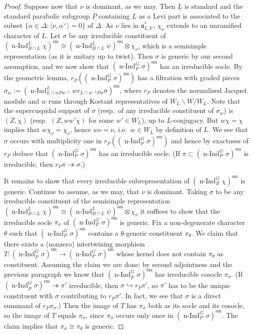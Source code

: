 \documentclass[a4paper]{amsart}
\numberwithin{equation}{section}
\theoremstyle{remark}
\theoremstyle{definition}
\DeclareMathOperator{\nInd}{n-Ind}
\newcommand{\R}{\mathbb{R}}
\newcommand{\sm}{\mathrm{sm}}
\newcommand{\alggrp}[1]{\underline{#1}}
\newcommand{\ang}[1]{\langle #1\rangle}
\newcommand{\into}{\hookrightarrow}
\newcommand{\onto}{\twoheadrightarrow}
\renewcommand{\o}[1]{\overline{#1}}
\begin{document}
\begin{proof}
  Suppose now that $\nu$ is dominant, as we may.
  Then $\alggrp{L}$ is standard and the standard parabolic subgroup $\alggrp{P}$ containing $\alggrp{L}$ as a Levi part is associated to the subset $\{\alpha \in \Delta : \ang{\nu,\alpha^\vee} = 0\}$ of $\Delta$.
  As $\nu$ lies in $\mathfrak a^*_{L,\R}$, $\chi_{\nu}$ extends to an unramified character of $L$.
  Let $\sigma$ be any irreducible constituent of $(\nInd_{B \cap L}^{L} \chi)^{\sm} \cong (\nInd_{B \cap L}^{L} \psi)^{\sm} \otimes \chi_\nu$, which is a semisimple representation (as it is unitary up to twist).
  Then $\sigma$ is generic by our second assumption, and we now show that $(\nInd_{P}^{G} \sigma)^{\sm}$ has an irreducible socle.
  By the geometric lemma, $r_P((\nInd_{P}^{G} \sigma)^{\sm})$ has a filtration with graded pieces $\sigma_w := (\nInd_{L \cap w P w^{-1}}^{L} w r_{L \cap w^{-1} P w}\sigma)^{\sm}$, where $r_P$ denotes the normalized Jacquet module and $w$ runs through Kostant representatives of $W_L\backslash W/W_L$.
  Note that the supercuspidal support of $\sigma$ (resp.\ of any irreducible constituent of $\sigma_w$) is $(Z,\chi)$ (resp.\ $(Z,ww'\chi)$ for some $w' \in W_L$), up to $L$-conjugacy.
  But $w\chi = \chi$ implies that $w\chi_\nu = \chi_\nu$, hence $w\nu = \nu$, i.e.\ $w \in W_L$ by definition of $L$.
  We see that $\sigma$ occurs with multiplicity one in $r_P((\nInd_{P}^{G} \sigma)^{\sm})$ and hence by exactness of $r_P$ deduce that $(\nInd_{P}^{G} \sigma)^{\sm}$ has an irreducible socle.
  (If $\pi \subset (\nInd_{P}^{G} \sigma)^{\sm}$ is irreducible, then $r_P \pi \onto \sigma$.)

  It remains to show that every irreducible subrepresentation of $(\nInd_{B}^{G} \chi)^{\sm}$ is generic.   Continue to assume, as we may, that $\nu$ is dominant.
  Taking $\sigma$ to be any irreducible constituent of the semisimple representation $(\nInd_{B \cap L}^{L} \chi)^{\sm} \cong (\nInd_{B \cap L}^{L} \psi)^{\sm} \otimes \chi_\nu$ it suffices to show that the irreducible socle $\pi_\sigma$ of $(\nInd_{P}^{G} \sigma)^{\sm}$ is generic.
  Fix a non-degenerate character $\theta$ such that $(\nInd_{P}^{G} \sigma)^{\sm}$ contains a $\theta$-generic constituent $\pi_\theta$.
  We claim that there exists a (nonzero) intertwining morphism $T \colon (\nInd_{\o P}^{G} \sigma)^{\sm} \to (\nInd_{P}^{G} \sigma)^{\sm}$ whose kernel does not contain $\pi_\theta$ as constituent.
  Assuming the claim we are done: by second adjointness and the previous paragraph we know that $(\nInd_{\o P}^{G} \sigma)^{\sm}$ has irreducible cosocle $\pi_\sigma$.
  (If $(\nInd_{\o P}^{G} \sigma)^{\sm} \onto \pi'$ irreducible, then $\sigma \into r_P \pi'$, so $\pi'$ has to be the unique constituent with $\sigma$ contributing to $r_P \pi'$.
  In fact, we see that $\sigma$ is a direct summand of $r_P \pi_\sigma$.)
  Then the image of $T$ has $\pi_\sigma$ both as its socle and its cosocle, so the image of $T$ equals $\pi_\sigma$, since $\pi_\sigma$ occurs only once in $(\nInd_{P}^{G} \sigma)^{\sm}$.
  The claim implies that $\pi_\sigma \cong \pi_\theta$ is generic.


\end{proof}
\end{document}
